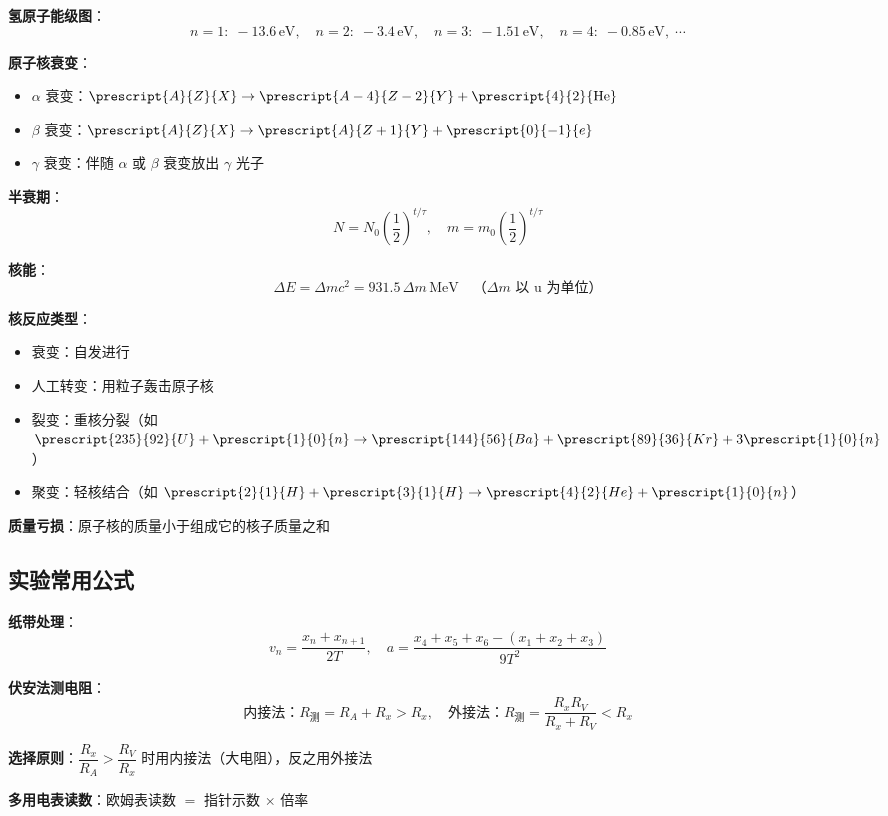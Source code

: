 \textbf{氢原子能级图}：
\[
n=1:\;-13.6\,\text{eV},\quad
n=2:\;-3.4\,\text{eV},\quad
n=3:\;-1.51\,\text{eV},\quad
n=4:\;-0.85\,\text{eV},\;\cdots
\]

\textbf{原子核衰变}：
\begin{itemize}
  \item $\alpha$ 衰变：$\prescript{A}{Z}{X} \to \prescript{A-4}{Z-2}{Y} + \prescript{4}{2}{\text{He}}$
  \item $\beta$ 衰变：$\prescript{A}{Z}{X} \to \prescript{A}{Z+1}{Y} + \prescript{0}{-1}{e}$
  \item $\gamma$ 衰变：伴随 $\alpha$ 或 $\beta$ 衰变放出 $\gamma$ 光子
\end{itemize}

\textbf{半衰期}：
\[
N = N_0\left(\frac12\right)^{t/\tau},\quad
m = m_0\left(\frac12\right)^{t/\tau}
\]

\textbf{核能}：
\[
\Delta E = \Delta m c^2 = 931.5\,\Delta m\,\text{MeV}\quad\text{（$\Delta m$ 以 u 为单位）}
\]

\textbf{核反应类型}：
\begin{itemize}
  \item 衰变：自发进行
  \item 人工转变：用粒子轰击原子核
  \item 裂变：重核分裂（如 $\prescript{235}{92}{U} + \prescript{1}{0}{n} \to \prescript{144}{56}{Ba} + \prescript{89}{36}{Kr} + 3\prescript{1}{0}{n}$）
  \item 聚变：轻核结合（如 $\prescript{2}{1}{H} + \prescript{3}{1}{H} \to \prescript{4}{2}{He} + \prescript{1}{0}{n}$）
\end{itemize}

\textbf{质量亏损}：原子核的质量小于组成它的核子质量之和

\subsection{实验常用公式}

\textbf{纸带处理}：
\[
v_n = \frac{x_n + x_{n+1}}{2T},\quad
a = \frac{x_4+x_5+x_6 - (x_1+x_2+x_3)}{9T^2}
\]

\textbf{伏安法测电阻}：
\[
\text{内接法：} R_{\text{测}} = R_A + R_x > R_x,\quad
\text{外接法：} R_{\text{测}} = \frac{R_xR_V}{R_x+R_V} < R_x
\]

\textbf{选择原则}：$\dfrac{R_x}{R_A} > \dfrac{R_V}{R_x}$ 时用内接法（大电阻），反之用外接法

\textbf{多用电表读数}：欧姆表读数 $=$ 指针示数 $\times$ 倍率

